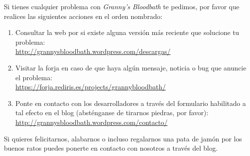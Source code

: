 Si tienes cualquier problema con \emph{Granny's Bloodbath} te pedimos, por favor que realices las siguientes acciones en el orden nombrado:

\begin{enumerate}
	\item Consultar la web por si existe alguna versión más reciente que solucione tu problema:\\
	\href{http://grannysbloodbath.wordpress.com/descargas/}{http://grannysbloodbath.wordpress.com/descargas/}
	\item Visitar la forja en caso de que haya algún mensaje, noticia o bug que anuncie el problema:\\
	\href{https://forja.rediris.es/projects/grannybloodbath/}{https://forja.rediris.es/projects/grannybloodbath/}
	\item Ponte en contacto con los desarrolladores a través del formulario habilitado a tal efecto en el blog (absténganse de tirarnos piedras, por favor):\\
	\href{http://grannysbloodbath.wordpress.com/contacto/}{http://grannysbloodbath.wordpress.com/contacto/}
\end{enumerate}

Si quieres felicitarnos, alabarnos o incluso regalarnos una pata de jamón por los buenos ratos puedes ponerte en contacto con nosotros a través del blog.
